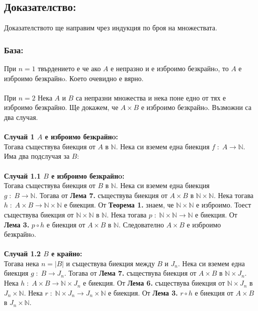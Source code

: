 \documentclass[a4paper, 12pt, oneside]{article}
\newcommand{\N}{\mathbb{N}}
\begin{document}
\subsection*{Доказателство:}
Доказателството ще направим чрез индукция по броя на множествата.
\subsubsection*{База:}
При \(n = 1\) твърдението е че ако \(A\) е непразно и е изброимо безкрайнo, то \(A\) е изброимо безкрайнo.
Което очевидно е вярно. \\
\hfill \\
\medskip
При \(n = 2\) Нека \(A\) и \(B\) са непразни множества и нека поне едно от тях е изброимо безкрайно.
Ще докажем, че \(A \times B\) е изброимо безкрайнo.
Възможни са два случая. \\
\hfill \\
\medskip
\textbf{Случай 1 \(A\) е изброимо безкрайнo:} \\
Тогава съществува биекция от \(A\) в \(\N\).
Нека си вземем една биекция \(f \; : \; A \to \N\).
Има два подслучая за \(B\): \\
\hfill \\
\medskip
\textbf{Случай 1.1 \(B\) е изброимо безкрайнo:} \\
Тогава съществува биекция от \(B\) в \(\N\).
Нека си вземем една биекция \\
\(g \; : \; B \to \N\). Тогава от \textbf{Лема 7.}
съществува биекция от \(A \times B\) в \(\N \times \N\).
Нека тогава \(h \; : \; A \times B \to \N \times \N\) е биекция.
От \textbf{Теорема 1.} знаем, че \(\N \times \N\) е изброимо.
Тоест съществува биекция от \(\N \times \N\) в \(\N\).
Нека тогава \(p \; : \; \N \times \N \to \N\) е биекция.
От \textbf{Лема 3.} \(p \circ h\) е биекция от \(A \times B\) в \(\N\).
Следователно \(A \times B\) е изброимо безкрайнo. \\
\hfill \\
\medskip
\textbf{Случай 1.2 \(B\) е крайно:} \\
Тогава нека \(n = |B|\) и съществува биекция между \(B\) и \(J_n\).
Нека си вземем една биекция \(g \; : \; B \to J_n\).
Тогава от \textbf{Лема 7.} съществува биекция от \(A \times B\) в \(\N \times J_n\).
Нека \(h \; : \; A \times B \to \N \times J_n\) е биекция.
От \textbf{Лема 6.} съществува биекция от \(\N \times J_n\) в \(J_n \times \N\).
Нека \(r \; : \; \N \times J_n \to J_n \times \N\) е биекция.
От \textbf{Лема 3.} \(r \circ h\) е биекция от \(A \times B\) в \(J_n \times \N\).
\end{document}
